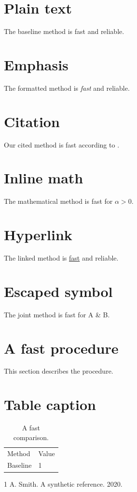 \documentclass{article}
\begin{document}
\section{Plain text}
The baseline method is fast and reliable.

\section{Emphasis}
The formatted method is \emph{fast} and reliable.

\section{Citation}
Our cited method is fast according to \cite{smith}.

\section{Inline math}
The mathematical method is fast for $\alpha > 0$.

\section{Hyperlink}
The linked method is \href{https://example.org}{fast} and reliable.

\section{Escaped symbol}
The joint method is fast for A \& B.

\section{A fast procedure}
This section describes the procedure.

\section{Table caption}
\begin{table}[h]\centering
\caption{A fast comparison.}
\begin{tabular}{ll}Method & Value \\ Baseline & 1\end{tabular}
\end{table}

\begin{thebibliography}{1}
 A. Smith. A synthetic reference. 2020.
\end{thebibliography}
\end{document}
